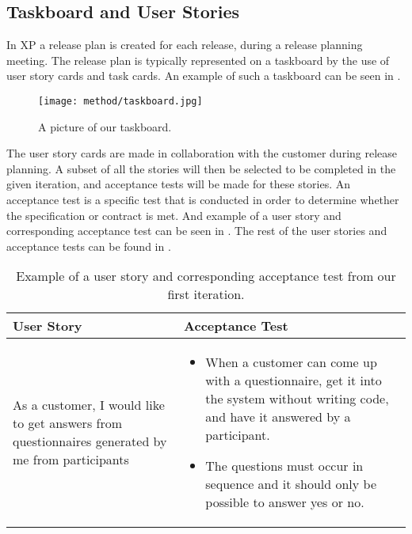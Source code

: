 \subsection{Taskboard and User Stories}
\label{sub:taskboard_and_user_stories}
In XP a release plan is created for each release, during a release planning meeting. The release plan is typically represented on a taskboard by the use of user story cards and task cards. An example of such a taskboard can be seen in .

\begin{figure}[!htbp]
    \centering
    \texttt{[image: method/taskboard.jpg]}
    \caption{A picture of our taskboard.}
    \label{fig:taskboard}
\end{figure}

The user story cards are made in collaboration with the customer during release planning.  A subset of all the stories will then be selected to be completed in the given iteration, and acceptance tests will be made for these stories. An acceptance test is a specific test that is conducted in order to determine whether the specification or contract is met. And example of a user story and corresponding acceptance test can be seen in . The rest of the user stories and acceptance tests can be found in .

\begin{table}[!htbp]
    \centering
    \begin{tabular}{| m{} | m{} |}
        \hline
        \textbf{User Story} & \textbf{Acceptance Test} \\ \hline
        As a customer, I would like to get answers from questionnaires generated by me from participants & 
        \begin{itemize}[noitemsep,parsep=0pt,partopsep=0pt]
        \item When a customer can come up with a questionnaire, get it into the system without writing code, and have it answered by a participant.
        \item The questions must occur in sequence and it should only be possible to answer yes or no.
     \end{itemize} \\ \hline
    \end{tabular}
    \caption{Example of a user story and corresponding acceptance test from our first iteration.}
    \label{tab:user_story_acceptance_test_example}
\end{table}
\FloatBarrier

